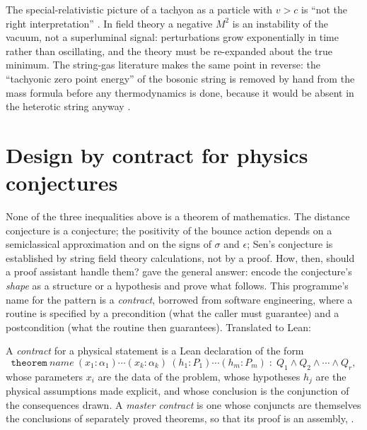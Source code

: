 \begin{pitfallbox}
The special-relativistic picture of a tachyon as a particle with $v>c$ is ``not the right
interpretation'' . In field theory a negative $M^2$
is an instability of the vacuum, not a superluminal signal: perturbations grow exponentially
in time rather than oscillating, and the theory must be re-expanded about the true minimum.
The string-gas literature makes the same point in reverse: the ``tachyonic zero point energy''
of the bosonic string is removed by hand from the mass formula before any thermodynamics is
done, because it would be absent in the heterotic string anyway .
\end{pitfallbox}

\section{Design by contract for physics conjectures}\label{sec:triad:contract}

None of the three inequalities above is a theorem of mathematics. The distance conjecture is a
conjecture; the positivity of the bounce action depends on a semiclassical approximation and
on the signs of $\sigma$ and $\epsilon$; Sen's conjecture is established by string field theory
calculations, not by a proof. How, then, should a proof assistant handle them? 
gave the general answer: encode the conjecture's \emph{shape} as a structure or a hypothesis and
prove what follows. This programme's name for the pattern is a \emph{contract}, borrowed from
software engineering, where a routine is specified by a precondition (what the caller must
guarantee) and a postcondition (what the routine then guarantees). Translated to Lean:

\begin{definition}[Contract]\label{def:triad:contract}
A \emph{contract} for a physical statement is a Lean declaration of the form
\[
\texttt{theorem}\ \textit{name}\ (x_1:\alpha_1)\cdots(x_k:\alpha_k)\ (h_1:P_1)\cdots(h_m:P_m)\;:\;
Q_1\wedge Q_2\wedge\cdots\wedge Q_r ,
\]
whose parameters $x_i$ are the data of the problem, whose hypotheses $h_j$ are the physical
assumptions made explicit, and whose conclusion is the conjunction of the consequences drawn.
A \emph{master contract} is one whose conjuncts are themselves the conclusions of separately
proved theorems, so that its proof is an assembly, .
\end{definition}

